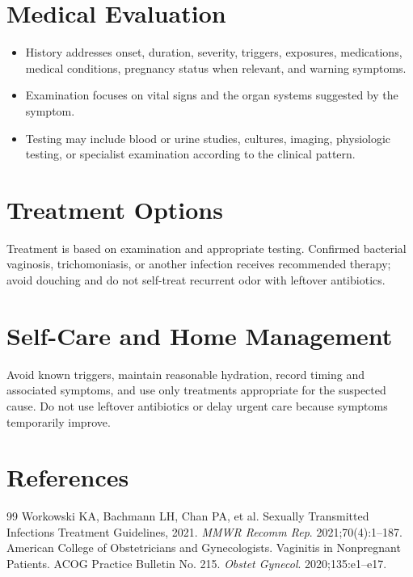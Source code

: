 \section*{Medical Evaluation}
\begin{itemize}
  \item History addresses onset, duration, severity, triggers, exposures, medications, medical conditions, pregnancy status when relevant, and warning symptoms.
  \item Examination focuses on vital signs and the organ systems suggested by the symptom.
  \item Testing may include blood or urine studies, cultures, imaging, physiologic testing, or specialist examination according to the clinical pattern.
\end{itemize}

\section*{Treatment Options}
Treatment is based on examination and appropriate testing. Confirmed bacterial vaginosis, trichomoniasis, or another infection receives recommended therapy; avoid douching and do not self-treat recurrent odor with leftover antibiotics.

\section*{Self-Care and Home Management}
Avoid known triggers, maintain reasonable hydration, record timing and associated symptoms, and use only treatments appropriate for the suspected cause. Do not use leftover antibiotics or delay urgent care because symptoms temporarily improve.

\section*{References}
\begin{thebibliography}{99}
 Workowski KA, Bachmann LH, Chan PA, et al. Sexually Transmitted Infections Treatment Guidelines, 2021. \textit{MMWR Recomm Rep}. 2021;70(4):1--187.
 American College of Obstetricians and Gynecologists. Vaginitis in Nonpregnant Patients. ACOG Practice Bulletin No. 215. \textit{Obstet Gynecol}. 2020;135:e1--e17.
\end{thebibliography}

